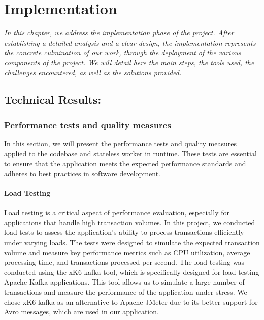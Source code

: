 \chapter{Implementation}
\textit{In this chapter, we address the implementation phase of the project. After establishing a detailed analysis and a clear design, the implementation represents the concrete culmination of our work, through the deployment of the various components of the project. We will detail here the main steps, the tools used, the challenges encountered, as well as the solutions provided.}
\pagebreak


\newpage

\section{Technical Results:}


\subsection{Performance tests and quality measures}
In this section, we will present the performance tests and quality measures applied to the codebase and stateless worker in runtime. These tests are essential to ensure that the application meets the expected performance standards and adheres to best practices in software development.

\subsubsection{Load Testing}

Load testing is a critical aspect of performance evaluation, especially for applications that handle high transaction volumes. In this project, we conducted load tests to assess the application's ability to process transactions efficiently under varying loads. The tests were designed to simulate the expected transaction volume and measure key performance metrics such as CPU utilization, average processing time, and transactions processed per second.
The load testing was conducted using the xK6-kafka tool, which is specifically designed for load testing Apache Kafka applications. This tool allows us to simulate a large number of transactions and measure the performance of the application under stress. We chose xK6-kafka as an alternative to Apache JMeter due to its better support for Avro messages, which are used in our application.


